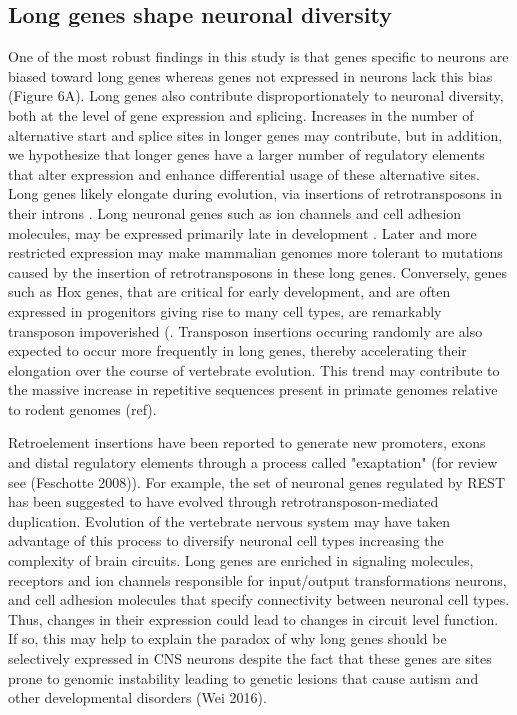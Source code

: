 \subsection{Long genes shape neuronal diversity}
One of the most robust findings in this study is that genes specific to neurons are biased toward long genes whereas genes not expressed in neurons lack this bias (Figure 6A). Long genes also contribute disproportionately to neuronal diversity, both at the level of gene expression and splicing. Increases in the number of alternative start and splice sites in longer genes may contribute, but in addition, we hypothesize that longer genes have a larger number of regulatory elements that alter expression and enhance differential usage of these alternative sites. Long genes likely elongate during evolution, via insertions of retrotransposons in their introns \cite{Sela_2007} \cite{Grishkevich_2014}. Long neuronal genes such as ion channels and cell adhesion molecules, may be expressed primarily late in development \cite{Okaty_2009}. Later and more restricted expression may make mammalian genomes more tolerant to mutations caused by the insertion of retrotransposons in these long genes. Conversely, genes such as Hox genes, that are critical for early development, and are often expressed in progenitors giving rise to many cell types, are remarkably transposon impoverished (\cite{Chinwalla_2002}\cite{Simons_2005}. Transposon insertions occuring randomly are also expected to occur more frequently in long genes, thereby accelerating their elongation over the course of vertebrate evolution. This trend may contribute to the massive increase in repetitive sequences present in primate genomes relative to rodent genomes (ref).

Retroelement insertions have been reported to generate new promoters, exons and distal regulatory elements through a process called "exaptation" (for review see (Feschotte 2008)). For example, the set of neuronal genes regulated by REST has been suggested to have evolved through retrotransposon-mediated duplication\cite{Johnson_2006}.  Evolution of the vertebrate nervous system may have taken advantage of this process to diversify neuronal cell types increasing the complexity of brain circuits. Long genes are enriched in signaling molecules, receptors and ion channels responsible for input/output transformations neurons, and cell adhesion molecules that specify connectivity between neuronal cell types. Thus, changes in their expression could lead to changes in circuit level function. If so, this may help to explain the paradox of why long genes should be selectively expressed in CNS neurons despite the fact that these genes are sites prone to genomic instability leading to genetic lesions that cause autism and other developmental disorders (Wei 2016).

